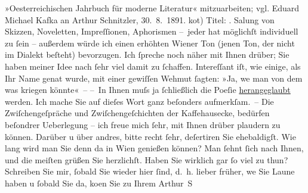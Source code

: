 \begin{ledgroupsized}[t]{13cm}
{{{                  »Oesterreichischen Jahrbuch für moderne Literatur« mitzuarbeiten; vgl. Eduard Michael Kafka an Arthur Schnitzler, 30. 8. 1891.}}}\label{K_L00018_1h} ko{\geminationm}t) Titel: \label{K_L00018_2v}\label{K_L00018_2h}. Sa{\geminationm}lung von
               Skizzen, Noveletten, Impreſſionen, Aphorismen – {\pb}jeder
               hat möglichſt individuell zu ſein – außerdem würde ich einen erhöhten Wiener Ton (jenen Ton, der nicht im Dialekt
               beſteht) bevorzugen\strikeout{)}.\pend
           \pstart
           Ich ſpreche noch näher mit Ihnen drüber; Sie haben meiner Idee nach ſehr viel damit
               zu ſchaffen. Intereſſant iſt, wie einige, als Ihr Name gena{\geminationn}t wurde, mit einer gewiſſen Wehmut ſagten: »Ja, we{\geminationn}{ }{\pb}man von dem was kriegen könnte« –\pend
           \pstart
           – In Ihnen muſs ja ſchließlich die Poeſie \uline{herangeglaubt} werden. Ich mache Sie auf dieſes Wort ganz beſonders
               aufmerkſam. – Die Zwiſchengeſpräche und Zwiſchengeſchichten der Kaffehausecke,
               bedürfen beſondrer Ueberlegung – ich freue mich ſehr, mit Ihnen drüber plaudern zu
               können. Darüber u über andres, {\pb}bitte recht ſehr,
               deſertiren Sie ehebaldigſt. Wie lang wird man Sie denn da{\geminationn} in Wien genießen können? Man ſehnt ſich nach
               Ihnen, und die meiſten grüßen Sie herzlichſt. Haben Sie wirklich gar ſo viel zu
               thun?\pend
           \pstart
           Schreiben Sie mir, ſobald Sie wieder hier ſind, d. h. lieber früher, we{\geminationn}{ }Sie Laune haben u ſobald Sie da, ko{\geminationm}en Sie zu\pend
           \pstart Ihrem \spacefill\mbox{Arthur S}\pend{}
         
         \endnumbering{}\end{ledgroupsized}  \newcommand{\dateiname}{L00018}\newcommand{\titel}{Arthur Schnitzler an Richard Beer-Hofmann, 6. 6. 1891}\newcommand{\editorInnen}{Martin Anton Müller und Gerd-Hermann Susen}
      